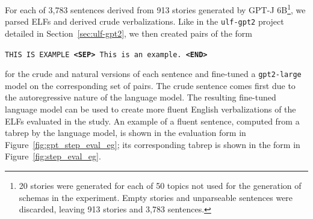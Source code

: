 For each of 3,783 sentences derived from 913 stories generated by GPT-J 6B\footnote{20 stories were generated for each of 50 topics not used for the generation of schemas in the experiment. Empty stories and unparseable sentences were discarded, leaving 913 stories and 3,783 sentences.}, we parsed ELFs and derived crude verbalizations. Like in the \texttt{ulf-gpt2} project detailed in Section~\ref{sec:ulf-gpt2}, we then created pairs of the form \begin{center}
\texttt{THIS IS EXAMPLE \textbf{<SEP>} This is an example. \textbf{<END>}}
\end{center}
for the crude and natural versions of each sentence and fine-tuned a \texttt{gpt2-large} model on the corresponding set of pairs. The crude sentence comes first due to the autoregressive nature of the language model. The resulting fine-tuned language model can be used to create more fluent English verbalizations of the ELFs evaluated in the study. An example of a fluent sentence, computed from a tabrep by the language model, is shown in the evaluation form in Figure~\ref{fig:gpt_step_eval_eg}; its corresponding tabrep is shown in the form in Figure~\ref{fig:step_eval_eg}.